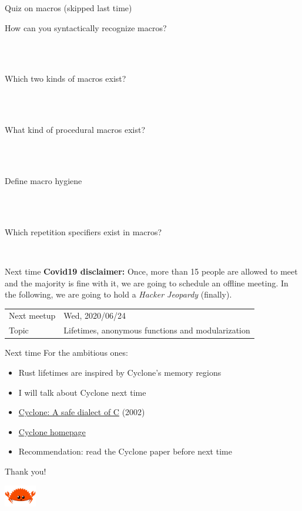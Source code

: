 \documentclass{beamer}
\begin{document}
\begin{frame}[fragile]{Quiz on macros (skipped last time)}
  \begin{description}
    \item[How can you syntactically recognize macros?] \hfill{} \\
      ~
    \item[Which two kinds of macros exist?] \hfill{} \\
      ~
    \item[What kind of procedural macros exist?] \hfill{} \\
      ~
    \item[Define macro hygiene] \hfill{} \\
      ~
    \item[Which repetition specifiers exist in macros?] \hfill{} \\
  \end{description}
\end{frame}

\begin{frame}[fragile]{Next time}
  \textbf{Covid19 disclaimer:}
    Once, more than 15 people are allowed to meet and the majority is fine with it,
    we are going to schedule an offline meeting. In the following, we are going to
    hold a \emph{Hacker Jeopardy} (finally).

  \begin{tabular}{ll}
    Next meetup  & Wed, 2020/06/24 \\
    Topic        & Lifetimes, anonymous functions and modularization
  \end{tabular}
\end{frame}

\begin{frame}[fragile]{Next time}
  For the ambitious ones:
  \begin{itemize}
    \item Rust lifetimes are inspired by Cyclone's memory regions
    \item I will talk about Cyclone next time
    \item \href{https://www.usenix.org/legacy/event/usenix02/full_papers/jim/jim_html/}{Cyclone: A safe dialect of C} (2002)
    \item \href{http://cyclone.thelanguage.org/}{Cyclone homepage}
    \item Recommendation: read the Cyclone paper before next time
  \end{itemize}
\end{frame}

\begin{frame}[standout]
  Thank you!

  \includegraphics[width=40pt]{images/rustacean-flat-happy.png}
\end{frame}
\end{document}
